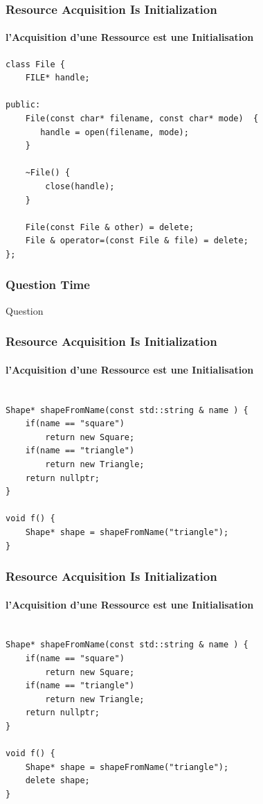 \documentclass[xetex,mathserif]{beamer}
\newcounter{QC}
\begin{document}
\begin{frame}[fragile]
\frametitle{Resource Acquisition Is Initialization}
\framesubtitle{l'Acquisition d'une Ressource est une Initialisation}
\begin{lstlisting} 
class File {
    FILE* handle;
	
public:
    File(const char* filename, const char* mode)  {
       handle = open(filename, mode);
    }
    
    ~File() {
        close(handle);
    }
    
    File(const File & other) = delete;
    File & operator=(const File & file) = delete;
};
\end{lstlisting}
\end{frame}


\begin{frame}
\frametitle{Question Time}
\huge Question  
\end{frame}


\begin{frame}[fragile]
\frametitle{Resource Acquisition Is Initialization}
\framesubtitle{l'Acquisition d'une Ressource est une Initialisation}
\begin{lstlisting}

Shape* shapeFromName(const std::string & name ) {
    if(name == "square")
        return new Square;
    if(name == "triangle")
        return new Triangle;
    return nullptr;
}

void f() {
    Shape* shape = shapeFromName("triangle");
}
\end{lstlisting}
\end{frame}


\begin{frame}[fragile]
\frametitle{Resource Acquisition Is Initialization}
\framesubtitle{l'Acquisition d'une Ressource est une Initialisation}
\begin{lstlisting}

Shape* shapeFromName(const std::string & name ) {
    if(name == "square")
        return new Square;
    if(name == "triangle")
        return new Triangle;
    return nullptr;
}

void f() {
    Shape* shape = shapeFromName("triangle");
    delete shape;
}
\end{lstlisting}
\end{frame}
\end{document}

